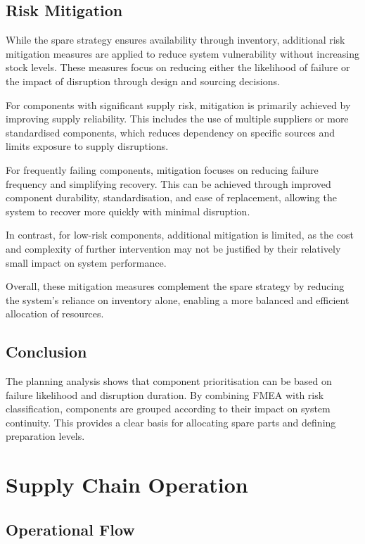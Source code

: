 \documentclass[11pt, a4paper]{report}
\numberwithin{equation}{section}
\begin{document}
\subsection{Risk Mitigation}

While the spare strategy ensures availability through inventory, additional risk mitigation measures are applied to reduce system vulnerability without increasing stock levels. These measures focus on reducing either the likelihood of failure or the impact of disruption through design and sourcing decisions.

For components with significant supply risk, mitigation is primarily achieved by improving supply reliability. This includes the use of multiple suppliers or more standardised components, which reduces dependency on specific sources and limits exposure to supply disruptions.

For frequently failing components, mitigation focuses on reducing failure frequency and simplifying recovery. This can be achieved through improved component durability, standardisation, and ease of replacement, allowing the system to recover more quickly with minimal disruption.

In contrast, for low-risk components, additional mitigation is limited, as the cost and complexity of further intervention may not be justified by their relatively small impact on system performance.

Overall, these mitigation measures complement the spare strategy by reducing the system's reliance on inventory alone, enabling a more balanced and efficient allocation of resources.

\subsection{Conclusion}

The planning analysis shows that component prioritisation can be based on failure likelihood and disruption duration. By combining FMEA with risk classification, components are grouped according to their impact on system continuity. This provides a clear basis for allocating spare parts and defining preparation levels.

\section{Supply Chain Operation}

\subsection{Operational Flow}
\end{document}
